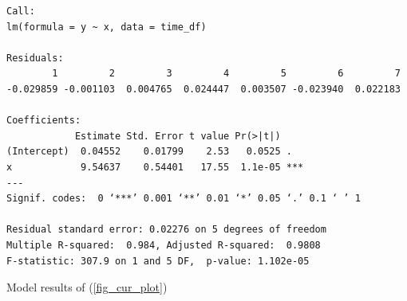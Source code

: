 \documentclass[a4paper,11pt]{article}
\newenvironment{longlisting}
{\addvspace{\baselineskip}\captionsetup{type=listing}}
{\addvspace{\baselineskip}}
\begin{document}
\begin{longlisting}
\begin{verbatim}
Call:
lm(formula = y ~ x, data = time_df)

Residuals:
        1         2         3         4         5         6         7
-0.029859 -0.001103  0.004765  0.024447  0.003507 -0.023940  0.022183

Coefficients:
            Estimate Std. Error t value Pr(>|t|)
(Intercept)  0.04552    0.01799    2.53   0.0525 .
x            9.54637    0.54401   17.55  1.1e-05 ***
---
Signif. codes:  0 ‘***’ 0.001 ‘**’ 0.01 ‘*’ 0.05 ‘.’ 0.1 ‘ ’ 1

Residual standard error: 0.02276 on 5 degrees of freedom
Multiple R-squared:  0.984,	Adjusted R-squared:  0.9808
F-statistic: 307.9 on 1 and 5 DF,  p-value: 1.102e-05
\end{verbatim}
\caption{Model results of (\ref{fig_cur_plot})}
\label{lst_cur}
\end{longlisting}

\begin{longlisting}
\inputminted{R}{analyse.r}
\end{longlisting}
\end{document}
